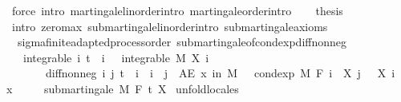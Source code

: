 \begin{isabellebody}
\ {\isacharparenleft}{\kern0pt}force\ intro{\isacharcolon}{\kern0pt}\ martingale{\isacharunderscore}{\kern0pt}linorder{\isachardot}{\kern0pt}intro\ martingale{\isacharunderscore}{\kern0pt}order{\isachardot}{\kern0pt}intro{\isacharparenright}{\kern0pt}\isanewline
\ \ \isamarkupfalse%
\ {\isacharquery}{\kern0pt}thesis\ \isamarkupfalse%
\ {\isacharparenleft}{\kern0pt}intro\ zero{\isachardot}{\kern0pt}max\ submartingale{\isacharunderscore}{\kern0pt}linorder{\isachardot}{\kern0pt}intro\ submartingale{\isacharunderscore}{\kern0pt}axioms{\isacharparenright}{\kern0pt}\isanewline
{}\isamarkupfalse%
%
\endisatagproof
{\isafoldproof}%
%
\isadelimproof
\isanewline
%
\endisadelimproof
\isanewline
{}\isamarkupfalse%
\isanewline
\isanewline
{}\isamarkupfalse%
\ {\isacharparenleft}{\kern0pt}\ sigma{\isacharunderscore}{\kern0pt}finite{\isacharunderscore}{\kern0pt}adapted{\isacharunderscore}{\kern0pt}process{\isacharunderscore}{\kern0pt}order{\isacharparenright}{\kern0pt}\ submartingale{\isacharunderscore}{\kern0pt}of{\isacharunderscore}{\kern0pt}cond{\isacharunderscore}{\kern0pt}exp{\isacharunderscore}{\kern0pt}diff{\isacharunderscore}{\kern0pt}nonneg{\isacharcolon}{\kern0pt}\isanewline
\ \ \ integrable{\isacharcolon}{\kern0pt}\ {\isachardoublequoteopen}{\isasymAnd}i{\isachardot}{\kern0pt}\ t\ {\isasymle}\ i\ {\isasymLongrightarrow}\ \ integrable\ M\ {\isacharparenleft}{\kern0pt}X\ i{\isacharparenright}{\kern0pt}{\isachardoublequoteclose}\ \isanewline
\ \ \ \ \ \ \ diff{\isacharunderscore}{\kern0pt}nonneg{\isacharcolon}{\kern0pt}\ {\isachardoublequoteopen}{\isasymAnd}i\ j{\isachardot}{\kern0pt}\ t\ {\isasymle}\ i\ {\isasymLongrightarrow}\ i\ {\isasymle}\ j\ {\isasymLongrightarrow}\ AE\ x\ in\ M{\isachardot}{\kern0pt}\ {}\ {\isasymle}\ cond{\isacharunderscore}{\kern0pt}exp\ M\ {\isacharparenleft}{\kern0pt}F\ i{\isacharparenright}{\kern0pt}\ {\isacharparenleft}{\kern0pt}{\isasymlambda}{\isasymxi}{\isachardot}{\kern0pt}\ X\ j\ {\isasymxi}\ {\isacharminus}{\kern0pt}\ X\ i\ {\isasymxi}{\isacharparenright}{\kern0pt}\ x{\isachardoublequoteclose}\isanewline
\ \ \ \ \ {\isachardoublequoteopen}submartingale\ M\ F\ t\ X{\isachardoublequoteclose}\isanewline
%
\isadelimproof
%
\endisadelimproof
%
\isatagproof
{}\isamarkupfalse%
\ {\isacharparenleft}{\kern0pt}unfold{\isacharunderscore}{\kern0pt}locales{\isacharparenright}{\kern0pt}\isanewline

\end{isabellebody}
